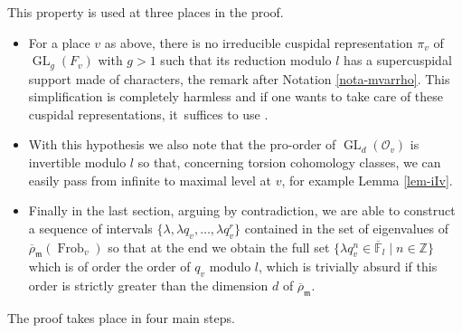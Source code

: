 \documentclass[JEP,XML,SOM,Unicode,published]{cedram}
\let\sep\mid
\DeclareMathOperator{\GL}{GL}
\theoremstyle{plain}
\theoremstyle{definition}
\numberwithin{equation}{subsection}
\newcommand\Fm{{\mathbb F}}
\newcommand\Zm{{\mathbb Z}}
\newcommand\OC{{\mathcal O}}
\DeclareMathOperator{\frob}{Frob}
\begin{document}
This property is used at three places in the proof.
\begin{itemize}
\item For a place $v$ as above, there is no irreducible cuspidal representation
$\pi_v$ of $\GL_g(F_v)$ with $g>1$ such that its reduction modulo $l$ has a supercuspidal
support made of characters, \cf the remark after Notation \ref{nota-mvarrho}.
This simplification is completely harmless and if one wants to take care of
these cuspidal representations, it~suffices to use \cite[Prop.\,2.4.1]{boyer-duke}.

\item With this hypothesis we also note that the pro-order of $\GL_d(\OC_v)$ is invertible
modulo $l$ so that, concerning torsion cohomology classes,
we can easily pass from infinite to maximal level at $v$, \cf for example Lemma \ref{lem-iIv}.

\item Finally in the last section, arguing by contradiction,
we are able to construct a sequence of intervals
$\{\lambda, \lambda q_v,\dots, \lambda q_v^{r}\}$ contained in the set of eigenvalues of
$\overline \rho_{\mathfrak m}(\frob_v)$ so that at the end we obtain the full set
$\{\lambda q_v^n \in \overline \Fm_l\sep n \in \Zm\}$ which is of order the order of $q_v$ modulo $l$, which
is trivially absurd if this order is strictly greater than the dimension $d$ of
$\overline \rho_{\mathfrak m}$.
\end{itemize}

The proof takes place in four main steps.
\end{document}

